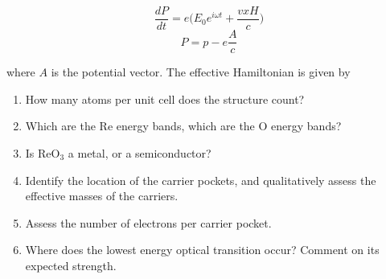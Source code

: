\[ \dfrac{dP}{dt} = e \biggl( E_0e^{i\omega t}+\dfrac{v x
  H}{c}\biggr)\]
\[ P = p - e \dfrac{A}{c}\]

where $A$ is the potential vector. The effective Hamiltonian is given
by 

\begin{enumerate}[label=(\roman*)]
\item How many atoms per unit cell does the structure count?
\item Which are the Re energy bands, which are the O energy bands?
\item Is ReO$_3$ a metal, or a semiconductor?
\item Identify the location of the carrier pockets, and qualitatively assess the
  effective masses of the carriers.
\item Assess the number of electrons per carrier pocket.
\item Where does the lowest energy optical transition occur? Comment
  on its expected strength.
\end{enumerate}


